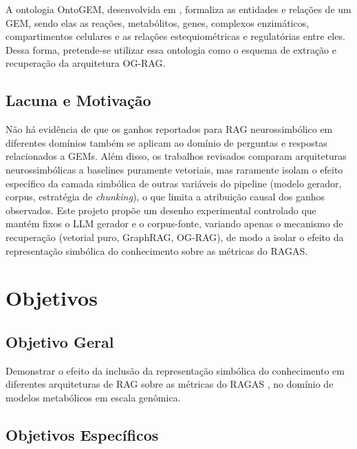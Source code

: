 \documentclass{article}
\begin{document}
A ontologia OntoGEM, desenvolvida em \cite{souza2025ontogem}, formaliza as entidades e relações de um GEM, sendo elas as reações, metabólitos, genes, complexos enzimáticos, compartimentos celulares e as relações estequiométricas e regulatórias entre eles. Dessa forma, pretende-se utilizar essa ontologia como o esquema de extração e recuperação da arquitetura OG-RAG.

\subsection{Lacuna e Motivação}

Não há evidência de que os ganhos reportados para RAG neurossimbólico em diferentes domínios também se aplicam ao domínio de perguntas e respostas relacionados a GEMs. Além disso, os trabalhos revisados comparam arquiteturas neurossimbólicas a baselines puramente vetoriais, mas raramente isolam o efeito específico da camada simbólica de outras variáveis do pipeline (modelo gerador, corpus, estratégia de \textit{chunking}), o que limita a atribuição causal dos ganhos observados. Este projeto propõe um desenho experimental controlado que mantém fixos o LLM gerador e o corpus-fonte, variando apenas o mecanismo de recuperação (vetorial puro, GraphRAG, OG-RAG), de modo a isolar o efeito da representação simbólica do conhecimento sobre as métricas do RAGAS.

\newpage

\section{Objetivos}

\subsection{Objetivo Geral}

Demonstrar o efeito da inclusão da representação simbólica do conhecimento em diferentes arquiteturas de RAG sobre as métricas do RAGAS \cite{es-etal-2024-ragas}, no domínio de modelos metabólicos em escala genômica.

\subsection{Objetivos Específicos}
\end{document}
